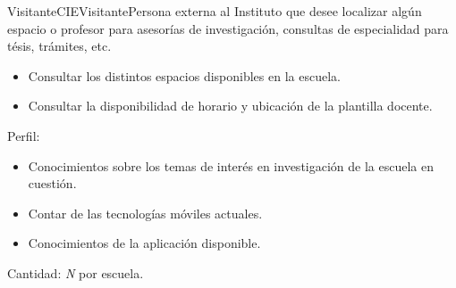 \begin{actor}{Visitante}{CIEVisitante}{Persona externa al Instituto que desee localizar algún espacio o profesor para asesorías de investigación, consultas de especialidad para tésis, trámites, etc.}
\begin{itemize}
		  \item Consultar los distintos espacios disponibles en la escuela.
		  \item Consultar la disponibilidad de horario y ubicación de la plantilla docente.
	  
    \end{itemize}

    \item[Perfil:] \hspace{1pt}

	\begin{itemize}

	    \item Conocimientos sobre los temas de interés en investigación de la escuela en cuestión.
	    \item Contar de las tecnologías móviles actuales.
	    \item Conocimientos de la aplicación disponible.

	\end{itemize}

    \item[Cantidad:] \textit{N} por escuela.

\end{actor}

%
%
%
%
%
%
%
%
%
%
%


